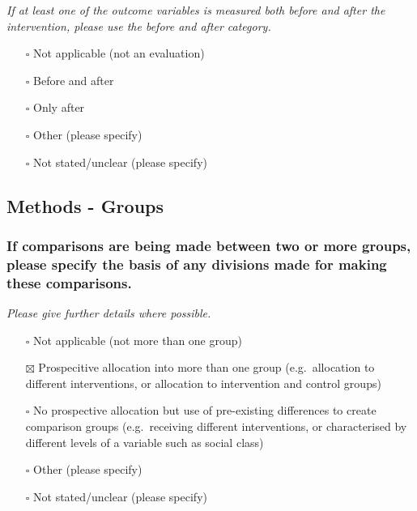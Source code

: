 \documentclass[
  doc, a4paper]{apa7}
\providecommand{\tightlist}{%
  \setlength{\itemsep}{0pt}\setlength{\parskip}{0pt}}
\begin{document}
\emph{If at least one of the outcome variables is measured both before and after the intervention, please use the before and after category.}

\begin{itemize}
\tightlist
\item[$\square$]
  Not applicable (not an evaluation)\\
\item[$\square$]
  Before and after\\
\item[$\square$]
  Only after\\
\item[$\square$]
  Other (please specify)\\
\item[$\square$]
  Not stated/unclear (please specify)
\end{itemize}

\subsection{Methods - Groups}\label{methods---groups}

\subsubsection{If comparisons are being made between two or more groups, please specify the basis of any divisions made for making these comparisons.}\label{if-comparisons-are-being-made-between-two-or-more-groups-please-specify-the-basis-of-any-divisions-made-for-making-these-comparisons.}

\emph{Please give further details where possible.}

\begin{itemize}
\tightlist
\item[$\square$]
  Not applicable (not more than one group)\\
\item[$\boxtimes$]
  Prospecitive allocation into more than one group (e.g.~allocation to different interventions, or allocation to intervention and control groups)\\
\item[$\square$]
  No prospective allocation but use of pre-existing differences to create comparison groups (e.g.~receiving different interventions, or characterised by different levels of a variable such as social class)\\
\item[$\square$]
  Other (please specify)\\
\item[$\square$]
  Not stated/unclear (please specify)
\end{itemize}
\end{document}
